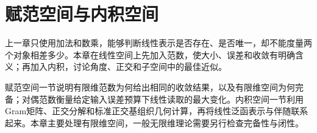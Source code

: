 \chapter{赋范空间与内积空间}
\label{chap:normed-inner-product-spaces}

上一章只使用加法和数乘，能够判断线性表示是否存在、是否唯一，却不能度量两个对象相差多少。本章在线性空间上先加入范数，使大小、误差和收敛有明确含义；再加入内积，讨论角度、正交和子空间中的最佳近似。

赋范空间一节说明有限维范数为何给出相同的收敛结果，以及有限维空间为何完备；对偶范数衡量给定输入误差预算下线性读取的最大变化。内积空间一节利用Gram矩阵、正交分解和标准正交基组织几何计算，再将线性泛函表示与伴随联系起来。本章主要处理有限维空间，一般无限维理论需要另行检查完备性与闭性。




